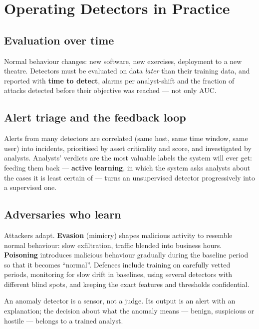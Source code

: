 \documentclass[11pt]{article}
\begin{document}
\section{Operating Detectors in Practice}
\subsection{Evaluation over time}
Normal behaviour changes: new software, new exercises, deployment to a new theatre. Detectors must be evaluated on data \emph{later} than their training data, and reported with \textbf{time to detect}, alarms per analyst-shift and the fraction of attacks detected before their objective was reached --- not only AUC.
\subsection{Alert triage and the feedback loop}
Alerts from many detectors are correlated (same host, same time window, same user) into incidents, prioritised by asset criticality and score, and investigated by analysts. Analysts' verdicts are the most valuable labels the system will ever get: feeding them back --- \textbf{active learning}, in which the system asks analysts about the cases it is least certain of --- turns an unsupervised detector progressively into a supervised one.
\subsection{Adversaries who learn}
Attackers adapt. \textbf{Evasion} (mimicry) shapes malicious activity to resemble normal behaviour: slow exfiltration, traffic blended into business hours. \textbf{Poisoning} introduces malicious behaviour gradually during the baseline period so that it becomes ``normal''. Defences include training on carefully vetted periods, monitoring for slow drift in baselines, using several detectors with different blind spots, and keeping the exact features and thresholds confidential.
\begin{keypoint}An anomaly detector is a sensor, not a judge. Its output is an alert with an explanation; the decision about what the anomaly means --- benign, suspicious or hostile --- belongs to a trained analyst.\end{keypoint}
\end{document}
